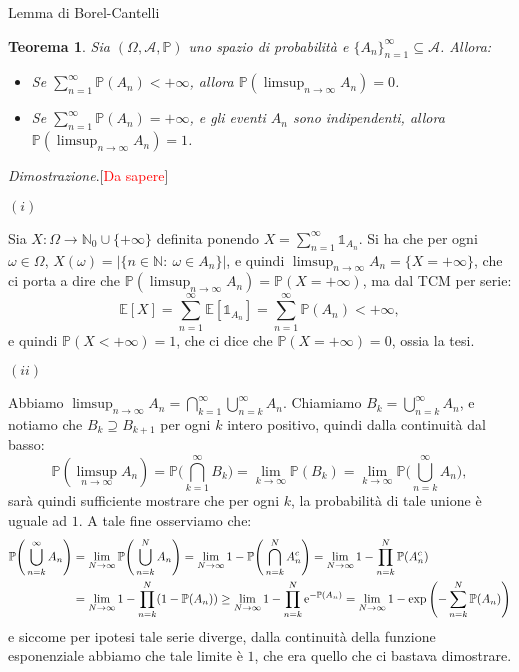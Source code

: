 \documentclass[11pt]{book}
\makeatletter
\theoremstyle{Definizione}
\theoremstyle{TeoremaProposizioneLemmaCorollario}
\newtheorem{myteo}{Teorema}[section]
\theoremstyle{OsservazioneNota}
\renewenvironment{proof}[1][\proofname]{\par
  \normalfont \topsep6\p@\@plus6\p@\relax
  \trivlist
  \item[\hskip\labelsep
        \itshape
    #1\@addpunct{.}]\ignorespaces
}{%
  \endtrivlist\@endpefalse
}
\newcommand{\N}{\mathbb{N}}
\renewcommand{\P}{\mathbb{P}}
\newcommand{\e}{\textup{e}}
\newcommand{\E}{\mathbb{E}}
\newcommand{\uno}[1]{\mathds{1}_{#1}}
\renewenvironment{proof}{\textsl{Dimostrazione}.}{}
\makeatother
\begin{document}
\begin{boxteo}{Lemma di Borel-Cantelli}
\begin{myteo}
Sia $(\Omega,\mathcal{A},\P)$ uno spazio di probabilità e $\{A_n\}_{n = 1}^\infty\subseteq \mathcal{A}$. Allora:
\begin{itemize}
\item[$(i)$] Se $\sum_{n = 1}^\infty \P(A_n) < +\infty$, allora $\P(\limsup_{n \to \infty} A_n) = 0$.
\item[$(ii)$] Se $\sum_{n = 1}^\infty \P(A_n) = +\infty$, e gli eventi $A_n$ sono indipendenti, allora $\P(\limsup_{n \to \infty} A_n) = 1$.
\end{itemize}
\end{myteo}
\tcblower
\begin{proof}[\textcolor{red}{Da sapere}]
\hfill 
\begin{flushleft}
$(i)$
\end{flushleft}
Sia $X : \Omega \longrightarrow \N_0 \cup \{+\infty\}$ definita ponendo $X = \sum_{n = 1}^\infty \uno{A_n}$. Si ha che per ogni $\omega\in \Omega$, $X(\omega) = |\{n\in \N:\ \omega\in A_n\}|$, e quindi $\limsup_{n \to \infty} A_n = \{X = +\infty\}$, che ci porta a dire che $\P(\limsup_{n \to \infty} A_n) = \P( X = +\infty)$, ma dal TCM per serie:
$$
\E[X] = \sum_{n = 1}^\infty \E[\uno{A_n}] = \sum_{n = 1}^\infty \P(A_n) <+\infty,
$$
e quindi $\P( X < +\infty) = 1$, che ci dice che $\P(X = +\infty) = 0$, ossia la tesi.
\begin{flushleft}
$(ii)$
\end{flushleft}
Abbiamo $\limsup_{n \to \infty} A_n = \bigcap_{k = 1}^\infty \bigcup_{n = k}^\infty A_n$. Chiamiamo $B_k = \bigcup_{n = k}^\infty A_n$, e notiamo che $B_k \supseteq B_{k+1}$ per ogni $k$ intero positivo, quindi dalla continuità dal basso:
$$
\P(\limsup_{n \to \infty} A_n) = \P\Bigg(\bigcap_{k = 1}^\infty B_k\Bigg) = \lim_{k \to \infty} \P(B_k) = \lim_{k \to \infty} \P\Bigg(\bigcup_{n = k}^\infty A_n\Bigg),
$$
sarà quindi sufficiente mostrare che per ogni $k$, la probabilità di tale unione è uguale ad $1$. A tale fine osserviamo che:
\begin{align*}
\P\Bigg(\bigcup_{n = k}^\infty A_n\Bigg) &= \lim_{N \to \infty} \P\Bigg(\bigcup_{n = k}^N A_n\Bigg) = \lim_{N \to \infty} 1-\P\Bigg(\bigcap_{n = k}^N A_n^c\Bigg) = \lim_{N\to \infty} 1-\prod_{n = k}^N \P(A_n^c) \\
&= \lim_{N \to \infty} 1- \prod_{n = k}^N (1-\P(A_n)) \geq \lim_{N \to \infty} 1 - \prod_{n = k}^N \e^{-\P(A_n)} = \lim_{N \to \infty} 1- \exp\left(-\sum_{n = k}^N \P(A_n)\right)
\end{align*}
e siccome per ipotesi tale serie diverge, dalla continuità della funzione esponenziale abbiamo che tale limite è $1$, che era quello che ci bastava dimostrare.
\end{proof}
\end{boxteo}
\end{document}
